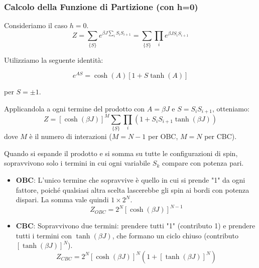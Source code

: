 \subsubsection{Calcolo della Funzione di Partizione (con h=0)}

Consideriamo il caso $h=0$.
\begin{equation}
Z = \sum_{\{\underline{S}\}} e^{\beta J \sum_i S_i S_{i+1}} = \sum_{\{\underline{S}\}} \prod_i e^{\beta J S_i S_{i+1}}
\end{equation}

Utilizziamo la seguente identità:


\begin{tcolorbox}[colback=red!15,  
                  colframe=red!40!orange,  
                  boxrule=0.8pt, 
                  arc=3pt,  
                  top=4pt, bottom=4pt, left=6pt, right=6pt,
                  enhanced,
                  sharp corners=south]
\begin{equation}
    e^{AS} = \cosh(A) [1 + S \tanh(A)]
\end{equation}
\end{tcolorbox}


per $S = \pm 1$. 

Applicandola a ogni termine del prodotto con $A = \beta J$ e $S=S_i S_{i+1}$, otteniamo:
\begin{equation}
Z = [\cosh(\beta J)]^M \sum_{\{\underline{S}\}} \prod_i (1 + S_i S_{i+1} \tanh(\beta J))
\end{equation}
dove $M$ è il numero di interazioni ($M=N-1$ per OBC, $M=N$ per CBC).

Quando si espande il prodotto e si somma su tutte le configurazioni di spin, sopravvivono solo i termini in cui ogni variabile $S_k$ compare con potenza pari.
\begin{itemize}
    \item \textbf{OBC}: L'unico termine che sopravvive è quello in cui si prende "1" da ogni fattore, poiché qualsiasi altra scelta lascerebbe gli spin ai bordi con potenza dispari. La somma vale quindi $1 \times 2^N$.
    \begin{equation}
    Z_{OBC} = 2^N [\cosh(\beta J)]^{N-1}
    \end{equation}
    
    \item \textbf{CBC}: Sopravvivono due termini:  prendere tutti "1" (contributo 1) e  prendere tutti i termini con $\tanh(\beta J)$, che formano un ciclo chiuso (contributo $[\tanh(\beta J)]^N$).
    \begin{equation}
    Z_{CBC} = 2^N [\cosh(\beta J)]^N \left(1 + [\tanh(\beta J)]^N\right)
    \end{equation}
\end{itemize}



